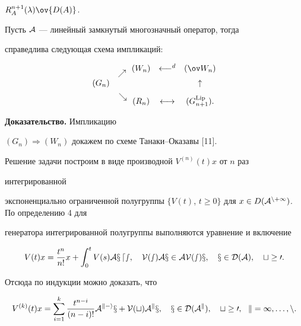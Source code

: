 $R^{n+1}_A(\lambda)\ov{D(A)}$. 





 


\begin{prop} 


Пусть $\cal A$ --- линейный замкнутый многозначный оператор, тогда 


справедлива следующая схема импликаций\/${:}$ 


$$ 


\begin{array}{cccc} 


& \raisebox{-2mm}{$\nearrow$} \ \ (W_n) & \longleftarrow^d & (\ov W_n) \\[2mm]


(G_n) & & & \uparrow \\[2mm]


& \raisebox{2mm}{$\searrow$} \ \ (R_n) & \longleftrightarrow & (G^{\Lip}_{n+1}). 


\end{array} 


$$ 


\end{prop} 





{\bf Доказательство.} Импликацию


$(G_n)\Longrightarrow(W_n)$ докажем по схеме Танаки--Оказавы [11]. 


Решение задачи построим в виде производной $V^{(n)}(t)x$ от $n$ раз 


интегрированной 


экспоненциально ограниченной полугруппы $\{V(t)$, $t\ge0\}$ для $x\in D(\cal 


A^{n+1})$. По определению 4 для 


генератора интегрированной полугруппы выполняются уравнение и включение 


\begin{equation} 


V(t)x=\frac{t^n}{n!}x+\int^t_0 V(s)\cal A x\,ds,\quad 


V(s)\cal A x\in\cal A V(s)x,\quad x\in D(\cal A),\quad t\ge0. 


\end{equation} 


Отсюда по индукции можно доказать, что 


\begin{equation} 


V^{(k)}(t)x=\sum^k_{i=1}\frac{t^{n-i}}{(n-i)!}\cal A^{k-i}x+ 


V(t)\cal A^k x,\quad x\in D(\cal A^k),\quad t\ge0,\ \ k=1,\dotsc,n. 


\end{equation} 


